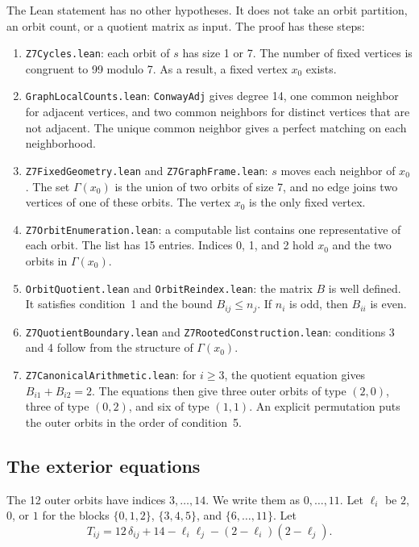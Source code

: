 \documentclass[pdflatex,sn-mathphys-num]{sn-jnl}
\theoremstyle{thmstyleone}
\theoremstyle{thmstyletwo}
\theoremstyle{thmstylethree}
\numberwithin{equation}{section}
\begin{document}
The Lean statement has no other hypotheses. It does not take an orbit partition, an orbit count, or a quotient matrix as input. The proof has these steps:
\begin{enumerate}
 \item \texttt{Z7Cycles.lean}: each orbit of $s$ has size 1 or 7. The number of fixed vertices is congruent to 99 modulo 7. As a result, a fixed vertex $x_0$ exists.
 \item \texttt{GraphLocalCounts.lean}: \texttt{ConwayAdj} gives degree 14, one common neighbor for adjacent vertices, and two common neighbors for distinct vertices that are not adjacent. The unique common neighbor gives a perfect matching on each neighborhood.
 \item \texttt{Z7FixedGeometry.lean} and \texttt{Z7GraphFrame.lean}: $s$ moves each neighbor of $x_0$. The set $\Gamma(x_0)$ is the union of two orbits of size 7, and no edge joins two vertices of one of these orbits. The vertex $x_0$ is the only fixed vertex.
 \item \texttt{Z7OrbitEnumeration.lean}: a computable list contains one representative of each orbit. The list has 15 entries. Indices 0, 1, and 2 hold $x_0$ and the two orbits in $\Gamma(x_0)$.
 \item \texttt{OrbitQuotient.lean} and \texttt{OrbitReindex.lean}: the matrix $B$ is well defined. It satisfies condition~1 and the bound $B_{ij} \le n_j$. If $n_i$ is odd, then $B_{ii}$ is even.
 \item \texttt{Z7QuotientBoundary.lean} and \texttt{Z7RootedConstruction.lean}: conditions 3 and 4 follow from the structure of $\Gamma(x_0)$.
 \item \texttt{Z7CanonicalArithmetic.lean}: for $i \ge 3$, the quotient equation gives $B_{i1} + B_{i2} = 2$. The equations then give three outer orbits of type $(2, 0)$, three of type $(0, 2)$, and six of type $(1, 1)$. An explicit permutation puts the outer orbits in the order of condition~5.
\end{enumerate}

\subsection{The exterior equations}

The 12 outer orbits have indices $3, \dots, 14$. We write them as $0, \dots, 11$. Let $\ell_i$ be $2$, $0$, or $1$ for the blocks $\{0,1,2\}$, $\{3,4,5\}$, and $\{6, \dots, 11\}$. Let
\begin{equation}
 T_{ij} = 12\,\delta_{ij} + 14 - \ell_i \ell_j - (2 - \ell_i)(2 - \ell_j).
 \label{eq:target}
\end{equation}
\end{document}
